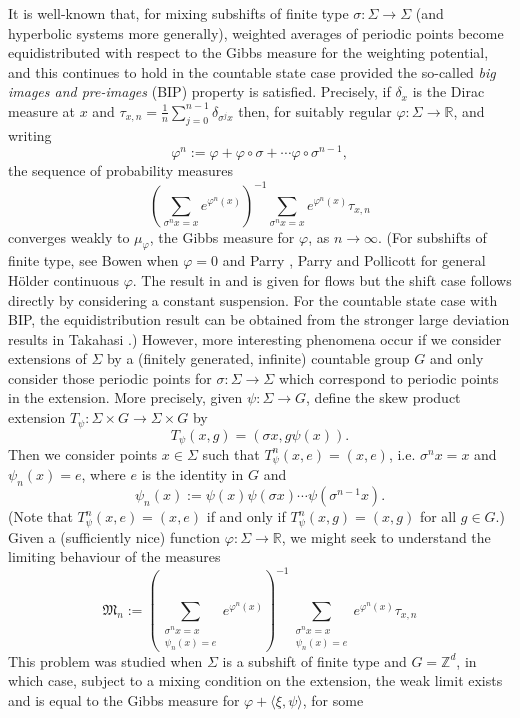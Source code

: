 \documentclass[11pt,letterpaper]{amsart}
\theoremstyle{definition}
\numberwithin{equation}{section}
\numberwithin{theorem}{section}
\def\Z{\mathbb{Z}}
\def\R{\mathbb{R}}
\def\vp{\varphi}
\def\R{\mathbb R}
\def\Z{\mathbb Z}
\begin{document}
It is well-known that, for mixing subshifts of finite type
$\sigma : \Sigma \to \Sigma$  (and hyperbolic systems more generally), weighted averages of periodic points 
become equidistributed with respect to the Gibbs measure for the weighting potential, and this continues to hold 
in the countable state case provided the so-called \emph{big images and pre-images} (BIP) property 
is satisfied. 
Precisely, if $\delta_x$ is the Dirac measure at $x$ and 
$\tau_{x,n} = \frac{1}{n}\sum_{j=0}^{n-1} \delta_{\sigma^jx}$ then, for suitably regular $\vp : \Sigma \to \R$,
and writing
\[
\vp^n := \vp + \vp \circ \sigma + \cdots \vp \circ \sigma^{n-1},
\]
the sequence of probability measures
\[
\left(\sum_{\sigma^nx=x} e^{\vp^n(x)} \right)^{-1}
\sum_{\sigma^n x=x} e^{\vp^n(x)} \tau_{x,n}
\]
converges weakly to $\mu_\vp$, the Gibbs measure for $\vp$, as $n \to \infty$.
(For subshifts of finite type, see Bowen \cite{Bowen1971} when $\vp=0$ and Parry \cite{Parry1988},
Parry and Pollicott \cite{PP} for general H\"older continuous $\vp$. The result 
in \cite{Parry1988} and \cite{PP} is given for flows
but the shift case follows directly by considering a constant suspension.
For the countable state case with BIP, the equidistribution result can be obtained from the stronger large deviation results in
Takahasi \cite{Takahasi2019}.)
However, more interesting phenomena occur if we consider extensions of $\Sigma$ by a (finitely generated, infinite)
countable group $G$ and only consider those periodic points for $\sigma : \Sigma \to \Sigma$
which correspond to periodic points in the extension.
More precisely, given $\psi : \Sigma \to G$, define the skew product extension
$T_\psi : \Sigma \times G \to \Sigma \times G$ by
\[
T_\psi(x,g) = (\sigma x,g\psi(x)).
\]
Then we consider points $x \in \Sigma$ such that $T_\psi^n(x,e)=(x,e)$, i.e. $\sigma^nx=x$ and 
$\psi_n(x)=e$, where $e$ is the identity in $G$
and
\[
\psi_n(x):= \psi(x)\psi(\sigma x) \cdots \psi(\sigma^{n-1}x).
\] 
(Note
that $T_\psi^n(x,e)=(x,e)$ if and only if $T_\psi^n(x,g)=(x,g)$ for all $g \in G$.)
Given a (sufficiently nice)
function $\vp : \Sigma \to \R$, we might seek to understand the limiting behaviour of the measures
\[
\mathfrak M_n :=
\left(\sum_{\substack{\sigma^nx=x \\ \psi_n(x)=e}} e^{\vp^n(x)} \right)^{-1}
\sum_{\substack{\sigma^n x=x \\ \psi_n(x)=e}} e^{\vp^n(x)} \tau_{x,n}
\]
This problem was studied when $\Sigma$ is a subshift of finite type and $G = \Z^d$, in which case,
subject to a mixing condition on the extension,
the weak limit exists and is equal to the Gibbs measure for $\vp + \langle \xi,\psi \rangle$, for some 
\end{document}
